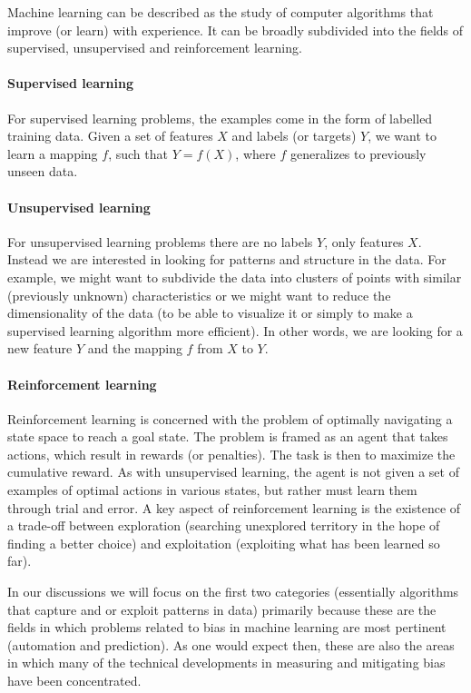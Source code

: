 Machine learning can be described as the study of computer algorithms that improve (or learn) with experience. It can be broadly subdivided into the fields of supervised, unsupervised and reinforcement learning.

\paragraph*{Supervised learning} For supervised learning problems, the examples come in the form of labelled training data. Given a set of features $X$ and labels (or targets) $Y$, we want to learn a mapping $f$, such that $Y = f(X)$, where $f$ generalizes to previously unseen data.
%
\paragraph*{Unsupervised learning} For unsupervised learning problems there are no labels $Y$, only features $X$. Instead we are interested in looking for patterns and structure in the data. For example, we might want to subdivide the data into clusters of points with similar (previously unknown) characteristics or we might want to reduce the dimensionality of the data (to be able to visualize it or simply to make a supervised learning algorithm more efficient). In other words, we are looking for a new feature $Y$ and the mapping $f$ from $X$ to $Y$. 
%
\paragraph*{Reinforcement learning} Reinforcement learning is concerned with the problem of optimally navigating a state space to reach a goal state. The problem is framed as an agent that takes actions, which result in rewards (or penalties). The task is then to maximize the cumulative reward. As with unsupervised learning, the agent is not given a set of examples of optimal actions in various states, but rather must learn them through trial and error. A key aspect of reinforcement learning is the existence of a trade-off between exploration (searching unexplored territory in the hope of finding a better choice) and exploitation (exploiting what has been learned so far).
\newline

In our discussions we will focus on the first two categories (essentially algorithms that capture and or exploit patterns in data) primarily because these are the fields in which problems related to bias in machine learning are most pertinent (automation and prediction). As one would expect then, these are also the areas in which many of the technical developments in measuring and mitigating bias have been concentrated.

